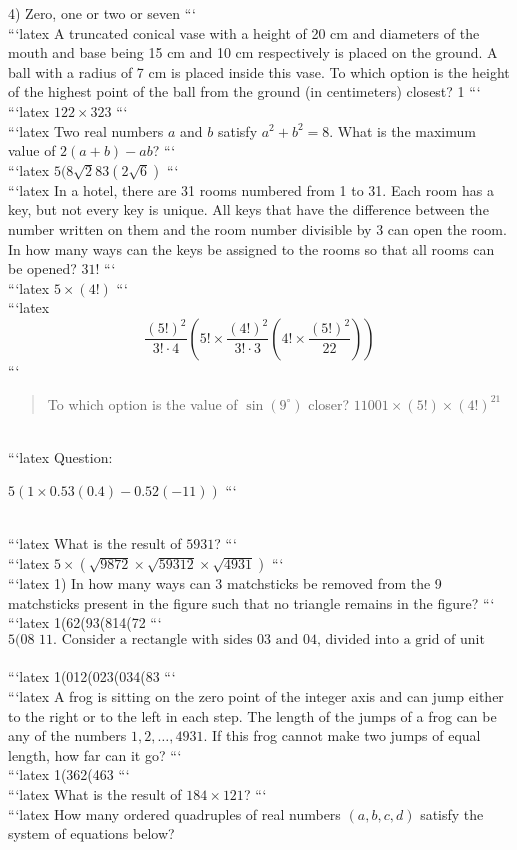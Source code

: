 4) Zero, one or two or seven
```
\\
```latex
A truncated conical vase with a height of 20 cm and diameters of the mouth and base being 15 cm and 10 cm respectively is placed on the ground. A ball with a radius of 7 cm is placed inside this vase. To which option is the height of the highest point of the ball from the ground (in centimeters) closest?
1
```
\\
```latex
$122 \times 323$
```
\\
```latex
Two real numbers $a$ and $b$ satisfy $a^2 + b^2 = 8$. What is the maximum value of $2(a+b) - ab$?
```
\\
```latex
$5(8 \sqrt{2} 83(2 \sqrt{6})$
```
\\
```latex
In a hotel, there are 31 rooms numbered from 1 to 31. Each room has a key, but not every key is unique. All keys that have the difference between the number written on them and the room number divisible by 3 can open the room. In how many ways can the keys be assigned to the rooms so that all rooms can be opened?
$31!$
```
\\
```latex
$5 \times (4!)$
```
\\
```latex
\[
\frac{(5!)^2}{3! \cdot 4} \left( 5! \times \frac{(4!)^2}{3! \cdot 3} \left( 4! \times \frac{(5!)^2}{22} \right) \right)
\]
```
\\
\begin{quote}
To which option is the value of $\sin(9^\circ)$ closer? $11001 \times (5!) \times (4!)^{21}$
\end{quote}
\\
```latex
Question: 

$5(1 \times 0.53(0.4) - 0.52(-11))$
```

\\
```latex
What is the result of $5931$?
```
\\
```latex
$5 \times (\sqrt{9872} \times \sqrt{59312} \times \sqrt{4931})$
```
\\
```latex
1) In how many ways can 3 matchsticks be removed from the 9 matchsticks present in the figure such that no triangle remains in the figure?
```
\\
```latex
1(62(93(814(72
```
\\
\[
\text{5(08 11. Consider a rectangle with sides 03 and 04, divided into a grid of unit squares by lines parallel to the sides. Take one of the diagonals of the original rectangle. How many of the unit squares in the grid are tangent to this diagonal?}
\]
\\
```latex
1(012(023(034(83
```
\\
```latex
A frog is sitting on the zero point of the integer axis and can jump either to the right or to the left in each step. The length of the jumps of a frog can be any of the numbers $1, 2, \ldots, 4931$. If this frog cannot make two jumps of equal length, how far can it go?
```
\\
```latex
1(362(463
```
\\
```latex
What is the result of $184 \times 121$?
```
\\
```latex
How many ordered quadruples of real numbers $(a, b, c, d)$ satisfy the system of equations below?

